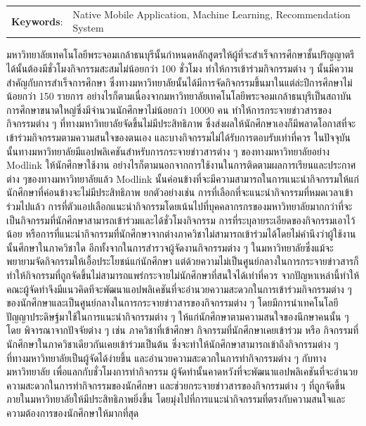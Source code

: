 \documentclass[14pt,oneside,openright,a4paper]{cpe-thai-project}
\begin{document}
\begin{flushleft}
\begin{tabular*}{\textwidth}{@{}lp{}}
\textbf{Keywords}: & Native Mobile Application, Machine Learning, Recommendation System
\end{tabular*}
\end{flushleft}
\endabstract


\thaiabstract
มหาวิทยาลัยเทคโนโลยีพระจอมเกล้าธนบุรีนั้นกำหนดหลักสูตรให้ผู้ที่จะสำเร็จการศึกษาชั้นปริญญาตรีได้นั้นต้องมีชั่วโมงกิจกรรมสะสมไม่น้อยกว่า 100 ชั่วโมง ทำให้การเข้าร่วมกิจกรรมต่าง ๆ นั้นมีความสำคัญกับการสำเร็จการศึกษา ซึ่งทางมหาวิทยาลัยนั้นได้มีการจัดกิจกรรมขึ้นมาในแต่ล่ะปีการศึกษาไม่น้อยกว่า 150 รายการ อย่างไรก็ตามเนื่องจากมหาวิทยาลัยเทคโนโลยีพระจอมเกล้าธนบุรีเป็นสถาบันการศึกษาขนาดใหญ่ซึ่งมีจำนวนนักศึกษาไม่น้อยกว่า 10000 คน ทำให้การกระจายข่าวสารของกิจกรรมต่าง ๆ ที่ทางมหาวิทยาลัยจัดขึ้นไม่มีประสิทธิภาพ ซึ่งส่งผลให้นักศึกษาเองก็มีพลาดโอกาสที่จะเข้าร่วมกิจกรรมตามความสนใจของตนเอง และบางกิจกรรมไม่ได้รับการตอบรับเท่าที่ควร
ในปัจจุบันนั้นทางมหาวิทยาลัยมีแอปพลิเคชันสำหรับการกระจายข่าวสารต่าง ๆ ของทางมหาวิทยาลัยอย่าง Modlink ให้นักศึกษาใช้งาน อย่างไรก็ตามนอกจากการใช้งานในการติดตามผลการเรียนและประกาศต่าง ๆของทางมหาวิทยาลัยแล้ว Modlink นั้นค่อนข้างที่จะมีความสามารถในการแนะนำกิจกรรมให้แก่นักศึกษาที่ค่อนข้างจะไม่มีประสิทธิภาพ ยกตัวอย่างเช่น การที่เลือกที่จะแนะนำกิจกรรมที่หมดเวลาเข้าร่วมไปแล้ว การที่ตัวแอปเลือกแนะนำกิจกรรมโดยเน้นไปที่บุคคลากรกรของมหาวิทยาลัยมากกว่าที่จะเป็นกิจกรรมที่นักศึกษาสามารถเข้าร่วมและได้ชั่วโมงกิจกรรม การที่ระบุลายระเอียดของกิจกรรมเอาไว้น้อย หรือการที่แนะนำกิจกรรมที่นักศึกษาจากต่างภาควิชาไม่สามารถเข้าร่วมได้โดยไม่คำนึงว่าผู้ใช้งานนั้นศึกษาในภาควิชาใด อีกทั้งจากในการสำรวจผู้จัดงานกิจกรรมต่าง ๆ ในมหาวิทยาลัยซึ่งแม้จะพยายามจัดกิจกรรมให้เอื้อประโยชน์แก่นักศึกษา แต่ด้วยความไม่เป็นศูนย์กลางในการกระจายข่าวสารก็ทำให้กิจกรรมที่ถูกจัดขึ้นไม่สามารถแพร่กระจายไม่นักศึกษาที่สนใจได้เท่าที่ควร จากปัญหาเหล่านี้ทำให้คณะผู้จัดทำจึงมีแนวคิดทีจะพัฒนาแอปพลิเคชันที่จะอำนวยความสะดวกในการเข้าร่วมกิจกรรมต่าง ๆ ของนักศึกษาและเป็นศูนย์กลางในการกระจายข่าวสารของกิจกรรมต่าง ๆ โดยมีการนำเทคโนโลยีปัญญาประดิษฐ์มาใช้ในการแนะนำกิจกรรมต่าง ๆ ให้แก่นักศึกษาตามความสนใจของนึกษาคนนั้น ๆ โดย พิจารณาจากปัจจัยต่าง ๆ เช่น  ภาควิชาที่เข้าศึกษา กิจกรรมที่นักศึกษาเคยเข้าร่วม หรือ กิจกรรมที่นักศึกษาในภาควิชาเดียวกันเคยเข้าร่วมเป็นต้น ซึ่งจะทำให้นักศึกษาสามารถเข้าถึงกิจกรรมต่าง ๆ ที่ทางมหาวิทยาลัยเป็นผู้จัดได้ง่ายขึ้น และอำนวยความสะดวกในการทำกิจกรรมต่าง ๆ กับทางมหาวิทยาลัย เพื่อแลกกับชั่วโมงการทำกิจกรรม
ผู้จัดทำนั้นคาดหวังที่จะพัฒนาแอปพลิเคชันที่จะอำนวยความสะดวกในการทำกิจกรรมของนักศึกษา และช่วยกระจายข่าวสารของกิจกรรมต่าง ๆ ที่ถูกจัดขึ้นภายในมหาวิทยาลัยให้มีประสิทธิภาพยิ่งขึ้น โดยมุ่งไปที่การแนะนำกิจกรรมที่ตรงกับความสนใจและความต้องการของนักศึกษาให้มากที่สุด 
\end{document}
